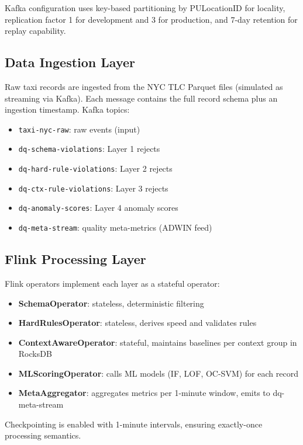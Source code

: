 Kafka configuration uses key-based partitioning by PULocationID for locality, replication factor 1 for development and 3 for production, and 7-day retention for replay capability.

\subsection{Data Ingestion Layer}

Raw taxi records are ingested from the NYC TLC Parquet files (simulated as streaming via Kafka). Each message contains the full record schema plus an ingestion timestamp. Kafka topics:

\begin{itemize}
    \item \texttt{taxi-nyc-raw}: raw events (input)
    \item \texttt{dq-schema-violations}: Layer 1 rejects
    \item \texttt{dq-hard-rule-violations}: Layer 2 rejects
    \item \texttt{dq-ctx-rule-violations}: Layer 3 rejects
    \item \texttt{dq-anomaly-scores}: Layer 4 anomaly scores
    \item \texttt{dq-meta-stream}: quality meta-metrics (ADWIN feed)
\end{itemize}

\subsection{Flink Processing Layer}

Flink operators implement each layer as a stateful operator:

\begin{itemize}
    \item \textbf{SchemaOperator}: stateless, deterministic filtering
    \item \textbf{HardRulesOperator}: stateless, derives speed and validates rules
    \item \textbf{ContextAwareOperator}: stateful, maintains baselines per context group in RocksDB
    \item \textbf{MLScoringOperator}: calls ML models (IF, LOF, OC-SVM) for each record
    \item \textbf{MetaAggregator}: aggregates metrics per 1-minute window, emits to dq-meta-stream
\end{itemize}

Checkpointing is enabled with 1-minute intervals, ensuring exactly-once processing semantics.

